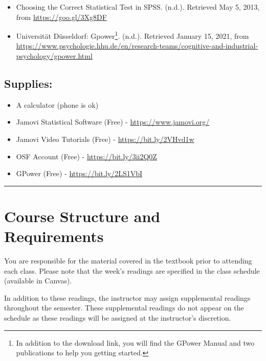 \documentclass[11pt,]{article}
\providecommand{\tightlist}{%
  \setlength{\itemsep}{0pt}\setlength{\parskip}{0pt}}
\begin{document}
\begin{itemize}
\tightlist
\item
  Choosing the Correct Statistical Test in SPSS. (n.d.). Retrieved May
  5, 2013, from \url{https://goo.gl/3Xg8DF}
\item
  Universität Düsseldorf: Gpower\footnote{In addition to the download
    link, you will find the GPower Manual and two publications to help
    you getting started.}. (n.d.). Retrieved January 15, 2021, from
  \url{https://www.psychologie.hhu.de/en/research-teams/cognitive-and-industrial-psychology/gpower.html}
\end{itemize}

\hypertarget{supplies}{%
\subsection{Supplies:}\label{supplies}}

\begin{itemize}
\tightlist
\item
  A calculator (phone is ok)
\item
  Jamovi Statistical Software (Free) - \url{https://www.jamovi.org/}
\item
  Jamovi Video Tutorials (Free) - \url{https://bit.ly/2VHvd1w}
\item
  OSF Account (Free) - \url{https://bit.ly/3ii2Q0Z}
\item
  GPower (Free) - \url{https://bit.ly/2LS1VbI}
\end{itemize}

\begin{center}\rule{0.5\linewidth}{0.5pt}\end{center}

\hypertarget{course-structure-and-requirements}{%
\section{Course Structure and
Requirements}\label{course-structure-and-requirements}}

You are responsible for the material covered in the textbook prior to
attending each class. Please note that the week's readings are specified
in the class schedule (available in Canvas).

In addition to these readings, the instructor may assign supplemental
readings throughout the semester. These supplemental readings do not
appear on the schedule as these readings will be assigned at the
instructor's discretion.
\end{document}
